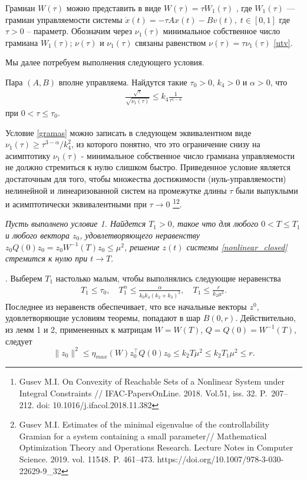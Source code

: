 \documentclass[../main.tex]{subfiles}
\begin{document}
	Грамиан $W(\tau)$ можно представить в виде $W(\tau) = \tau W_1(\tau)$ , где $W_1(\tau)$ --- грамиан управляемости системы $ \dot{x}(t) = -\tau A x(t) - B v(t),\;  t \in [0, 1]$ где  $ \tau > 0 $ -- параметр. Обозначим через $\nu_1(\tau)$ минимальное собственное число грамиана $W_1(\tau)$; $\nu(\tau)$ и $\nu_1(\tau)$ связаны равенством  $\nu(\tau)=\tau \nu_1(\tau)$ \eqref{utv}.
	
	Мы далее потребуем выполнения следующего условия.
	\begin{cond}\label{condC}
		Пара $(A,B)$ вполне управляема. Найдутся такие $\tau_0>0$,  $ k_4 > 0$ и $\alpha > 0$, что
		\begin{gather}\label{gramas}
			\frac{\sqrt{\tau}}{\sqrt{\nu_1(\tau)}} \leqslant k_4 \frac{1}{\tau^{1-\alpha}}
		\end{gather}
		при $0<\tau \leqslant \tau_0$.
	\end{cond}
	
	Условие \eqref{gramas} можно записать в следующем эквивалентном виде $\nu_1(\tau) \geqslant\tau^{3-\alpha}/k_4^2 $, из которого понятно, что это ограничение снизу на асимптотику $\nu_1(\tau)$ - минимальное собственное число грамиана управляемости не должно стремиться к нулю слишком быстро. 
	Приведенное условие является достаточным для того, чтобы множества достижимости (нуль-управляемости) нелинейной и линеаризованной систем на промежутке длины $\tau$ были выпуклыми и асимптотически эквивалентными при $\tau \to 0$ \footnote{Gusev M.I. On Convexity of Reachable Sets of a Nonlinear System under Integral Constraints // IFAC-PapersOnLine. 2018. Vol.51, iss. 32. P.~207--212. doi: 10.1016/j.ifacol.2018.11.382}\footnote{Gusev M.I. Estimates of the minimal eigenvalue of the controllability Gramian for a system containing a small parameter//  Mathematical Optimization Theory and Operations Research. Lecture Notes in Computer Science. 2019. vol. 11548. P. 461--473.  https://doi.org/10.1007/978-3-030-22629-9\_32}.
	\begin{theorem}
	{\it Пусть выполнено условие 1. Найдется $T_1>0$, такое что для любого $0<T \leqslant T_1$ и любого вектора $z_0$, удовлетворяющего неравенству $z_0 Q(0)z_0=z_0 W^{-1}(T)z_0\leqslant \mu^2$, решение $z(t)$ системы \eqref{nonlinear_closed} стремится к нулю при $t \to T$}. 
	\end{theorem}
	\doc.
	Выберем  $T_1$ настолько малым, чтобы выполнялись следующие неравенства
	\begin{gather}\label{t1}
	T_1 \leqslant \tau_0,\quad T_1^\alpha \leqslant
	\frac{\alpha}{k_0k_4(k_2+k_3)^2}, \quad T_1 \leqslant \frac{r}{k_2\mu^2}.
	\end{gather}
	Последнее из неравенств обеспечивает, что все начальные векторы $z^0$, удовлетворяющие условиям теоремы, попадают в шар $B(0,r)$. Действительно, из лемм 1 и 2, примененных к матрицам $W=W(T)$, $Q=Q(0)=W^{-1}(T)$, следует 
			$$\| z_0 \|^2 \leqslant \eta_{max}(W)z_0^{\top}Q(0)z_0\leqslant k_2T\mu^2 \leqslant k_2T_1\mu^2 \leqslant r.$$  
	  
\end{document}
